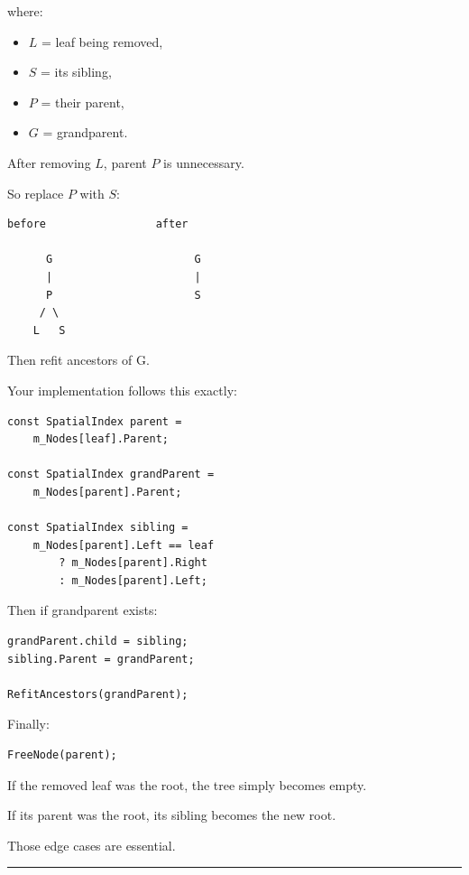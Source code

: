 where:

\begin{itemize}
\tightlist
\item
  \(L\) = leaf being removed,
\item
  \(S\) = its sibling,
\item
  \(P\) = their parent,
\item
  \(G\) = grandparent.
\end{itemize}

After removing \(L\), parent \(P\) is unnecessary.

So replace \(P\) with \(S\):

\begin{verbatim}
before                 after

      G                      G
      |                      |
      P                      S
     / \
    L   S
\end{verbatim}

Then refit ancestors of G.

Your implementation follows this exactly:

\begin{verbatim}
const SpatialIndex parent =
    m_Nodes[leaf].Parent;

const SpatialIndex grandParent =
    m_Nodes[parent].Parent;

const SpatialIndex sibling =
    m_Nodes[parent].Left == leaf
        ? m_Nodes[parent].Right
        : m_Nodes[parent].Left;
\end{verbatim}

Then if grandparent exists:

\begin{verbatim}
grandParent.child = sibling;
sibling.Parent = grandParent;

RefitAncestors(grandParent);
\end{verbatim}

Finally:

\begin{verbatim}
FreeNode(parent);
\end{verbatim}

If the removed leaf was the root, the tree simply becomes empty.

If its parent was the root, its sibling becomes the new root.

Those edge cases are essential.

\begin{center}\rule{0.5\linewidth}{0.5pt}\end{center}

